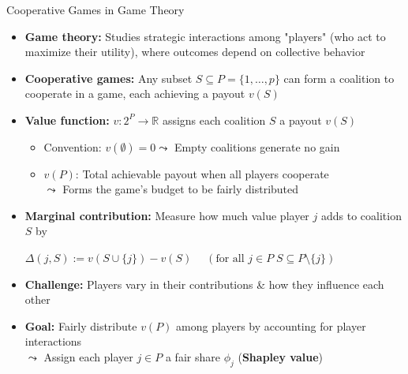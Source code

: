 \documentclass[11pt,compress,t,notes=noshow, aspectratio=169, xcolor=table]{beamer}
\begin{document}
\begin{frame}{Cooperative Games in Game Theory }
\begin{itemize}%
  \item \textbf{Game theory:} Studies strategic interactions among "players" (who act to maximize their utility), where outcomes depend on collective behavior
  \item \textbf{Cooperative games:} Any subset $S \subseteq P = \{1, \ldots, p\}$ can form a coalition to cooperate in a game, each achieving a payout $v(S)$
  \pause
  \item \textbf{Value function:} $v: 2^P \rightarrow \mathbb{R}$ assigns each coalition $S$ a payout $v(S)$ 
  \begin{itemize}
      \item Convention: $v(\emptyset) = 0 \leadsto$  Empty coalitions generate no gain
      \item $v(P)$: Total achievable payout when all players cooperate\\
      $\leadsto$ Forms the game's budget to be fairly distributed
  \end{itemize}%
    \item \textbf{Marginal contribution:} Measure how much value player \(j\) adds to coalition \( S \) by

    \medskip
    
    \centerline{$\Delta (j, S) := v(S \cup \{j\}) - v(S) \quad \; \left(\text{for all } j \in P \; S \subseteq P \setminus \{j\}\right)$}

    \medskip
    \pause
  \item \textbf{Challenge:} Players vary in their contributions \& how they influence each other
  \item \textbf{Goal:} Fairly distribute $v(P)$ among players by accounting for player interactions\\
  $\leadsto$ Assign each player $j \in P$ a fair share $\phi_j$ (\textbf{Shapley value}) 
\end{itemize}
\end{frame}
\end{document}
